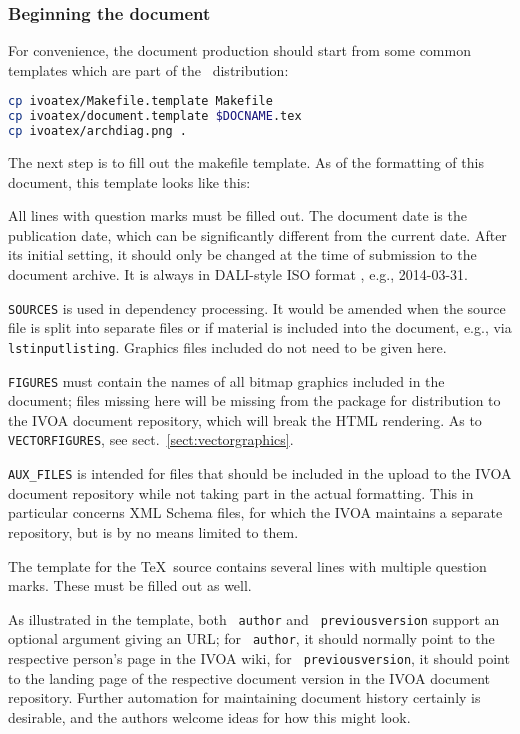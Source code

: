 \documentclass[11pt,a4paper]{ivoa}
\newcommand{\texword}[1]{\texttt{\color{texcolor} #1}}
\begin{document}
\subsubsection{Beginning the document}
\label{sect:beginning}

For convenience, the document production should start from some common
templates which are part of the \ivoatex\ distribution:

\begin{lstlisting}[language=sh]
cp ivoatex/Makefile.template Makefile
cp ivoatex/document.template $DOCNAME.tex
cp ivoatex/archdiag.png .
\end{lstlisting}

The next step is to fill out the makefile template.  
As of the formatting of this document, this template looks like this:



All lines with question marks must be filled out.  The document date
is the publication date, which can be significantly different from the
current date.  After its initial setting, it should only be changed at
the time of submission to the document archive.  It is always in
DALI-style ISO format \citep{std:DALI}, e.g., 2014-03-31.

\texttt{SOURCES} is used in dependency processing.  It would be amended
when the source file is split into separate files or if material is
included into the document, e.g., via \texword{lstinputlisting}.
Graphics files included do not need to be given here.

\texttt{FIGURES} must contain the names of all bitmap graphics included
in the document; files missing here will be missing from the package for
distribution to the IVOA document repository, which will break the HTML
rendering.  As to \texttt{VECTORFIGURES}, see
sect.~\ref{sect:vectorgraphics}.

\texttt{AUX\_FILES} is intended for files that should be included in the
upload to the IVOA document repository while not taking part in the
actual formatting.  This in particular concerns XML Schema files, for
which the IVOA maintains a separate repository, but is by no means
limited to them.

The template for the \TeX\ source contains several lines with
multiple question marks.  These must be filled out as well.

As illustrated in the template, both \texword{author} and
\texword{previousversion} support an optional argument giving an URL; for
\texword{author}, it should normally point to the respective person's
page in the IVOA wiki, for \texword{previousversion}, it should point to
the landing page of the respective document version in the IVOA document
repository.  Further automation for maintaining document history
certainly is desirable, and the authors welcome ideas for how this might
look.
\end{document}
